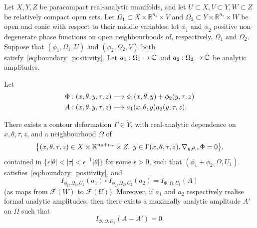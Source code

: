 \documentclass[10pt]{amsart}
\theoremstyle{definition}\newtheorem{defi}[theo]{Definition}\newtheorem{rema}[theo]{Remark}\newtheorem{exam}[theo]{Example}\newtheorem{exem}[theo]{Example}\newtheorem{nota}[theo]{Notation}
\newcommand{\clF}{\mathcal{F}}
\newcommand\1{\mathds{1}}
\newcommand{\R}{\mathbb{R}}
\newcommand{\C}{\mathbb{C}}
\renewcommand*{\to}{\mathchoice{\longrightarrow}{\rightarrow}{\rightarrow}{\rightarrow}}
\let\oldmapsto\mapsto
\renewcommand*{\mapsto}{\mathchoice{\longmapsto}{\oldmapsto}{\oldmapsto}{\oldmapsto}}
\let\originalleft\left
\let\originalright\right
\renewcommand{\left}{\mathopen{}\mathclose\bgroup\originalleft}
\renewcommand{\right}{\aftergroup\egroup\originalright}
\begin{document}
\begin{prop}\label{prop:compo_well_def}
Let $X,Y,Z$ be paracompact
real-analytic manifolds, and let $U\subset X,V\subset Y,W\subset Z$ be relatively compact open sets. Let $\Omega_1\subset X\times \R^{n_{\theta}}\times V$ and $\Omega_2\subset Y\times \R^{n_{\tau}}\times W$ be open and conic with respect to their middle variables; let $\phi_1$ and $\phi_2$ positive non-degenerate phase functions on open neighbourhoods of, respectively, $\Omega_1$ and $\Omega_2$. Suppose that $(\phi_1,\Omega_1,U)$ and $(\phi_2,\Omega_2,V)$ both satisfy~\eqref{eq:boundary_positivity}. Let $a_1:\Omega_1\to \C$ and $a_2:\Omega_2\to \C$ be analytic amplitudes.

Let
\begin{align*}
\Phi:(x,\theta,y,\tau,z)&\mapsto
\phi_1(x,\theta,y)+\phi_2(y,\tau,z)
\\
A:(x,\theta,y,\tau,z)&\mapsto a_1(x,\theta,y)a_2(y,\tau,z).
\end{align*}

There exists a contour deformation $\Gamma\in \widetilde{Y}$, with real-analytic dependence on $x,\theta,\tau,z$, and a neighbourhood $\Omega$ of
\[
\left\{(x,\theta,\tau,z)\in X\times \R^{n_{\theta}+n_{\tau}}\times Z,\; y\in
\Gamma(x,\theta,\tau,z),\nabla_{y,\theta,\tau}\Phi=0\right\},
\]
contained in $\{\epsilon|\theta|<|\tau|<\epsilon^{-1}|\theta|\}$ for some $\epsilon>0$, such that $(\phi_1+\phi_2,\Omega,U_1)$ satisfies~\eqref{eq:boundary_positivity}, and
\[
I_{\phi_1,\Omega_1,U_1}(a_1)\circ I_{\phi_2,\Omega_2,U_2}(a_2)=I_{\Phi,\Omega,U_1}(A)
\]
(as maps from $\clF(W)$ to $\clF(U)$). Moreover, if $a_1$ and $a_2$ respectively realise formal analytic amplitudes, then there exists a maximally analytic amplitude $A'$ on $\Omega$ such that
\[
I_{\Phi,\Omega,U_1}(A-A')=0.
\]
\end{prop}
\end{document}
